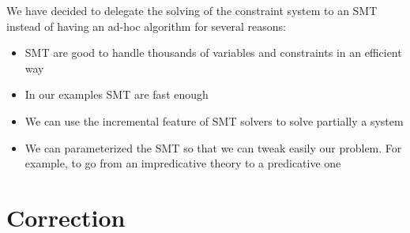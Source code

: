 \documentclass[conference]{IEEEtran}
\newcommand{\universo}{\textsc{Universo}}
\newcommand{\erasure}[1]{\ensuremath{|#1|}}
\newcommand{\absT}[3]{\lambda~#1^{#2}.#3}
\newcommand{\PiT}[3]{\Pi~#1^{#2}.#3}
\begin{document}
We have decided to delegate the solving of the constraint system to an SMT instead of having an ad-hoc algorithm for several reasons:
\begin{itemize}
\item SMT are good to handle thousands of variables and constraints in an efficient way
\item In our examples SMT are fast enough
\item We can use the incremental feature of SMT solvers to solve partially a system
\item We can parameterized the SMT so that we can tweak easily our problem. For example, to go from an impredicative theory to a predicative one
\end{itemize}

\section{Correction}



\end{document}
